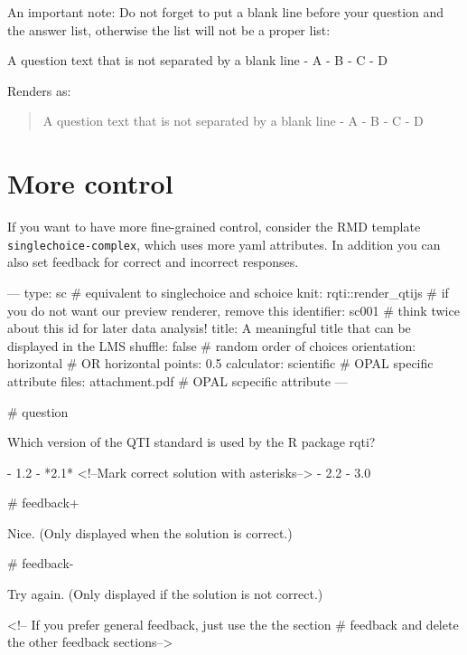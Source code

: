 \documentclass[twoside]{tufte-book}
\newenvironment{Shaded}{}{}
\newcommand{\NormalTok}[1]{#1}
\begin{document}
An important note: Do not forget to put a blank line before your question and the answer list, otherwise the list will not be a proper list:

\begin{Shaded}
\begin{Highlighting}[]
\NormalTok{A question text that is not separated by a blank line}
\NormalTok{{-} A}
\NormalTok{{-} B}
\NormalTok{{-} C}
\NormalTok{{-} D}
\end{Highlighting}
\end{Shaded}

Renders as:

\begin{quote}
A question text that is not separated by a blank line - A - B - C - D
\end{quote}

\section{More control}\label{more-control}

If you want to have more fine-grained control, consider the RMD template \texttt{singlechoice-complex}, which uses more yaml attributes. In addition you can also set feedback for correct and incorrect responses.

\begin{Shaded}
\begin{Highlighting}
---
type: sc # equivalent to singlechoice and schoice
knit: rqti::render_qtijs # if you do not want our preview renderer, remove this
identifier: sc001 # think twice about this id for later data analysis!
title: A meaningful title that can be displayed in the LMS
shuffle: false # random order of choices
orientation: horizontal # OR horizontal
points: 0.5
calculator: scientific # OPAL specific attribute
files: attachment.pdf # OPAL scpecific attribute
---

# question

Which version of the QTI standard is used by the R package rqti?

- 1.2
- *2.1* <!--Mark correct solution with asterisks-->
- 2.2
- 3.0

# feedback+

Nice. (Only displayed when the solution is correct.)

# feedback-

Try again. (Only displayed if the solution is not correct.)

<!-- If you prefer general feedback, just use the the section # feedback and 
delete the other feedback sections-->
\end{Highlighting}
\end{Shaded}
\end{document}
